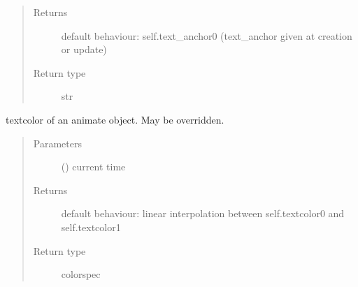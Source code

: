 \documentclass[letterpaper,10pt,english]{sphinxmanual}
\begin{document}
\begin{fulllineitems}
\begin{fulllineitems}
\begin{quote}
\begin{description}
\item[{Returns}] \leavevmode
{} \textendash{} default behaviour: self.text\_anchor0 (text\_anchor given at creation or update)

\item[{Return type}] \leavevmode
str

\end{description}\end{quote}

\end{fulllineitems}


\begin{fulllineitems}
\label{\detokenize{Reference:salabim.Animate.textcolor}}
textcolor of an animate object. May be overridden.
\begin{quote}\begin{description}
\item[{Parameters}] \leavevmode
{} () \textendash{} current time

\item[{Returns}] \leavevmode
{} \textendash{} default behaviour: linear interpolation between self.textcolor0 and self.textcolor1

\item[{Return type}] \leavevmode
colorspec

\end{description}\end{quote}

\end{fulllineitems}



\end{fulllineitems}
\end{document}
